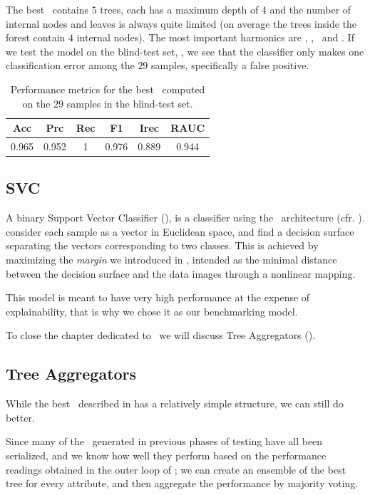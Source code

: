 The best \rf\ contains $5$ trees, each has a maximum depth of $4$ and the number of
internal nodes and leaves is always quite limited (on average the trees inside the forest contain
$4$ internal nodes). The most important harmonics are \cnmod[2], \cnmod[5], \phin[6]\ and \phin[10].
If we test the model on the blind-test set, \db, we see that the classifier only makes one classification error among the $29$ samples, specifically a false positive.
\begin{table}[!ht]
	\caption{Performance metrics for the best \rf\ computed on the $29$ samples in the
		blind-test set.}\label{tab:qrp-rf-test}

	\bigskip
	\setlength{\tabcolsep}{6pt}
	\centering
	\begin{tabular}{cccccc}
		\toprule
		\textbf{Acc} & \textbf{Prc} & \textbf{Rec} & \textbf{F1} & \textbf{Irec} & \textbf{RAUC} \\
		\midrule
		0.965        & 0.952        & 1            & 0.976       & 0.889         & 0.944         \\
		\bottomrule
	\end{tabular}
\end{table}

\subsection{SVC}
\label{sec:qrp-svc}
A binary Support Vector Classifier (\svc), is a classifier using the \svm\ architecture (cfr.
). \svcs consider each sample as a vector in Euclidean space, and find a decision
surface separating the vectors corresponding to two classes. This is achieved by maximizing the
\emph{margin} we introduced in , intended as the minimal distance between the decision
surface and the data images through a nonlinear mapping.

This model is meant to have very high performance at the expense of explainability, that is why we chose it as our benchmarking model.

To close the chapter dedicated to \qrp\ we will discuss Tree Aggregators (\tas).

\subsection{Tree Aggregators}
\label{sec:qrp-ta}
While the best \rf\ described in  has a relatively simple structure, we can still do better.

Since many of the \dts\ generated in previous phases of testing have all been serialized, and we
know how well they perform based on the performance readings obtained in the outer loop of \ncv; we
can create an ensemble of the best tree for every attribute, and then aggregate the performance by majority voting.

